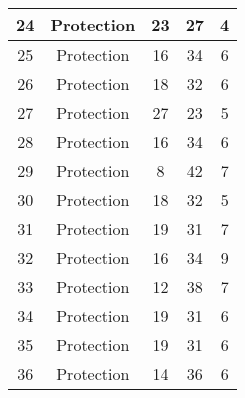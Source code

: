 \documentclass[results.tex]{subfiles}
\begin{document}
\begin{center}
\begin{tabular}{| c || c | c | c | c |}
            \hline
            24                      & Protection                   & 23                     & 27                      & 4                    \\
            \hline
            25                      & Protection                   & 16                     & 34                      & 6                    \\
            \hline
            26                      & Protection                   & 18                     & 32                      & 6                    \\
            \hline
            27                      & Protection                   & 27                     & 23                      & 5                    \\
            \hline
            28                      & Protection                   & 16                     & 34                      & 6                    \\
            \hline
            29                      & Protection                   & 8                      & 42                      & 7                    \\
            \hline
            30                      & Protection                   & 18                     & 32                      & 5                    \\
            \hline
            31                      & Protection                   & 19                     & 31                      & 7                    \\
            \hline
            32                      & Protection                   & 16                     & 34                      & 9                    \\
            \hline
            33                      & Protection                   & 12                     & 38                      & 7                    \\
            \hline
            34                      & Protection                   & 19                     & 31                      & 6                    \\
            \hline
            35                      & Protection                   & 19                     & 31                      & 6                    \\
            \hline
            36                      & Protection                   & 14                     & 36                      & 6                    \\

\end{tabular}
\end{center}
\end{document}
